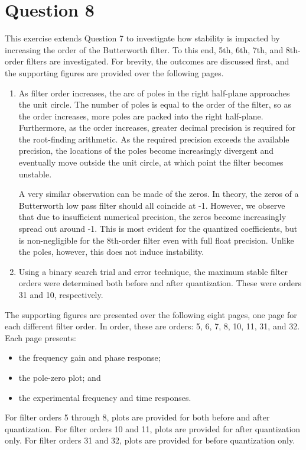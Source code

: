 \section*{Question 8}

This exercise extends Question 7 to investigate how stability is impacted by increasing the order of the Butterworth filter. To this end, 5th, 6th, 7th, and 8th-order filters are investigated. For brevity, the outcomes are discussed first, and the supporting figures are provided over the following pages.

\begin{enumerate}[label=\alph*)]

    \item As filter order increases, the arc of poles in the right half-plane approaches the unit circle. The number of poles is equal to the order of the filter, so as the order increases, more poles are packed into the right half-plane. Furthermore, as the order increases, greater decimal precision is required for the root-finding arithmetic. As the required precision exceeds the available precision, the locations of the poles become increasingly divergent and eventually move outside the unit circle, at which point the filter becomes unstable.

    A very similar observation can be made of the zeros. In theory, the zeros of a Butterworth low pass filter should all coincide at -1. However, we observe that due to insufficient numerical precision, the zeros become increasingly spread out around -1. This is most evident for the quantized coefficients, but is non-negligible for the 8th-order filter even with full float precision. Unlike the poles, however, this does not induce instability.

    \item Using a binary search trial and error technique, the maximum stable filter orders were determined both before and after quantization. These were orders 31 and 10, respectively.

\end{enumerate}

The supporting figures are presented over the following eight pages, one page for each different filter order. In order, these are orders: 5, 6, 7, 8, 10, 11, 31, and 32. Each page presents:
\begin{itemize}
    \item the frequency gain and phase response;
    \item the pole-zero plot; and
    \item the experimental frequency and time responses.
\end{itemize}
For filter orders 5 through 8, plots are provided for both before and after quantization. For filter orders 10 and 11, plots are provided for after quantization only. For filter orders 31 and 32, plots are provided for before quantization only.

